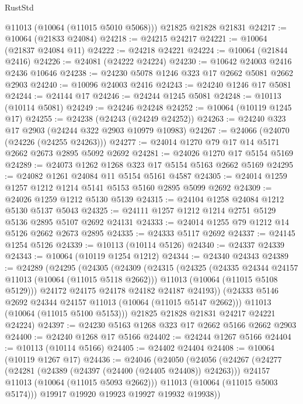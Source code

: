 \begin{lexlean}{RustStd}
\begin{coremodule}
      @11013
      (@10064 (@11015 @5010 @5068)))
    @21825
    @21828
    @21831
@24217 := @10064 (@21833 @24084)
@24218 := @24215 @24217
@24221 := @10064 (@21837 @24084 @11)
@24222 := @24218 @24221
@24224 := @10064 (@21844 @2416)
@24226 := @24081 (@24222 @24224)
@24230 := @10642 @24003 @2416 @2436 @10646
@24238 := @24230 @5078 @1246 @323 @17 @2662 @5081 @2662 @2903
@24240 := @10096 @24003 @2416
@24243 := @24240 @1246 @17 @5081
@24244 := @24144 @17
@24246 := @24244 @1245 @5081
@24248 := @10113 (@10114 @5081)
@24249 := @24246 @24248
@24252 := @10064 (@10119 @1245 @17)
@24255 := @24238 (@24243 (@24249 @24252))
@24263 := @24240 @323 @17 @2903 (@24244 @322 @2903 @10979 @10983)
@24267 := @24066 (@24070 (@24226 (@24255 @24263)))
@24277 := @24014 @1270 @79 @17 @14 @5171 @2662 @2673 @2895 @5092 @2692
@24281 := @24026 @1270 @17 @5154 @5169
@24289 := @24073 @1262 @1268 @323 @17 @5154 @5163 @2662 @5169
@24295 := @24082 @1261 @24084 @11 @5154 @5161 @4587
@24305 := @24014 @1259 @1257 @1212 @1214 @5141 @5153 @5160 @2895 @5099 @2692
@24309 := @24026 @1259 @1212 @5130 @5139
@24315 := @24104 @1258 @24084 @1212 @5130 @5137 @5043
@24325 := @24111 @1257 @1212 @1214 @2751 @5129 @5136 @2895 @5107 @2692 @24131
@24333 := @24014 @1255 @79 @1212 @14 @5126 @2662 @2673 @2895
@24335 := @24333 @5117 @2692
@24337 := @24145 @1254 @5126
@24339 := @10113 (@10114 @5126)
@24340 := @24337 @24339
@24343 := @10064 (@10119 @1254 @1212)
@24344 := @24340 @24343
@24389 := @24289
    (@24295
      (@24305
        (@24309
          (@24315
            (@24325
              (@24335 @24344 @24157 @11013 (@10064 (@11015 @5118 @2662)))
              @11013
              (@10064 (@11015 @5108 @5129)))
            @24172
            @24175
            @24178
            @24182
            @24187
            @24193))
        (@24333 @5146 @2692 @24344 @24157 @11013 (@10064 (@11015 @5147 @2662)))
        @11013
        (@10064 (@11015 @5100 @5153)))
      @21825
      @21828
      @21831
      @24217
      @24221
      @24224)
@24397 := @24230 @5163 @1268 @323 @17 @2662 @5166 @2662 @2903
@24400 := @24240 @1268 @17 @5166
@24402 := @24244 @1267 @5166
@24404 := @10113 (@10114 @5166)
@24405 := @24402 @24404
@24408 := @10064 (@10119 @1267 @17)
@24436 := @24046
    (@24050
      (@24056
        (@24267
          (@24277
            (@24281 (@24389 (@24397 (@24400 (@24405 @24408)) @24263)))
            @24157
            @11013
            (@10064 (@11015 @5093 @2662)))
          @11013
          (@10064 (@11015 @5003 @5174)))
        @19917
        @19920
        @19923
        @19927
        @19932
        @19938))

\end{coremodule}
\end{lexlean}
